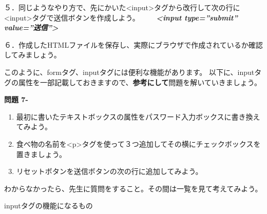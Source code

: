 \documentclass[a4paper,12pt,dvipdfmx]{jarticle}
\newcounter{Question}
\renewcommand\theQuestion{\textbf{問題 7-\arabic{Question}}}
\begin{document}
５．同じようなやり方で、先にかいた{\textless}input{\textgreater}タグから改行して次の行に{\textless}input{\textgreater}タグで送信ボタンを作成しよう。\newline
\ \ \ \ \textbf{\textit{{\textless}input type=”submit” value=”送信”{\textgreater}}}

６．作成したHTMLファイルを保存し、実際にブラウザで作成されているか確認してみましょう。\newline


このように、formタグ、inputタグには便利な機能があります。\newline
以下に、inputタグの属性を一部記載しておきますので、\textbf{参考にして}問題を解いていきましょう。


\bigskip

\clearpage
{}\theQuestion\newline
\begin{enumerate}
	\item 最初に書いたテキストボックスの属性をパスワード入力ボックスに書き換えてみよう。
	\item 食べ物の名前を{\textless}p{\textgreater}タグを使って３つ追加してその横にチェックボックスを置きましょう。
	\item リセットボタンを送信ボタンの次の行に追加してみよう。
\end{enumerate}

\samepage

わからなかったら、先生に質問をすること。その間は一覧を見て考えてみよう。

inputタグの機能になるもの
\end{document}
